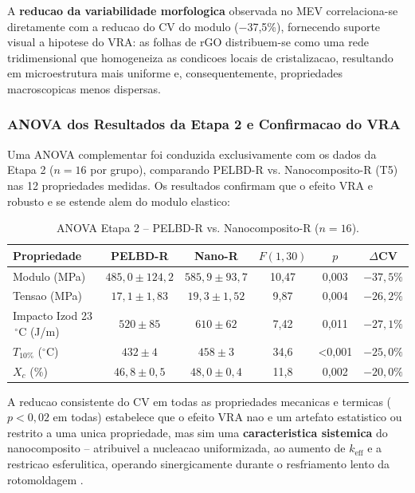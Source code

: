 \documentclass[11pt,a4paper,oneside]{article}
\begin{document}
A {\bfseries reducao da variabilidade morfologica} observada no MEV correlaciona-se diretamente com a reducao do CV do modulo ($-$37,5\%), fornecendo suporte visual a hipotese do VRA: as folhas de rGO distribuem-se como uma rede tridimensional que homogeneiza as condicoes locais de cristalizacao, resultando em microestrutura mais uniforme e, consequentemente, propriedades macroscopicas menos dispersas.

\subsubsection{ANOVA dos Resultados da Etapa 2 e Confirmacao do VRA}

Uma ANOVA complementar foi conduzida exclusivamente com os dados da Etapa 2 ($n{=}16$ por grupo), comparando PELBD-R vs. Nanocomposito-R (T5) nas 12 propriedades medidas. Os resultados confirmam que o efeito VRA e robusto e se estende alem do modulo elastico:

\begin{table}[H]\centering
\caption{ANOVA Etapa 2 -- PELBD-R vs. Nanocomposito-R ($n{=}16$).}\label{tab:anova2}
\begin{tabular}{lccccc}
\toprule
{\bfseries Propriedade} & {\bfseries PELBD-R} & {\bfseries Nano-R} & {\bfseries $F(1{,}30)$} & {\bfseries $p$} & {\bfseries $\Delta$CV} \\
\midrule
Modulo (MPa)     & $485{,}0{\pm}124{,}2$ & $585{,}9{\pm}93{,}7$  & 10{,}47 & 0{,}003  & $-37{,}5\%$ \\
Tensao (MPa)     & $17{,}1{\pm}1{,}83$   & $19{,}3{\pm}1{,}52$   & 9{,}87  & 0{,}004  & $-26{,}2\%$ \\
Impacto Izod 23$\,^{\circ}$C (J/m) & $520{\pm}85$ & $610{\pm}62$ & 7{,}42 & 0{,}011 & $-27{,}1\%$ \\
$T_{10\%}$ ($^{\circ}$C) & $432{\pm}4$   & $458{\pm}3$   & 34{,}6  & <0{,}001 & $-25{,}0\%$ \\
$X_c$ (\%)       & $46{,}8{\pm}0{,}5$    & $48{,}0{\pm}0{,}4$    & 11{,}8  & 0{,}002  & $-20{,}0\%$ \\
\bottomrule
\end{tabular}
\end{table}

A reducao consistente do CV em todas as propriedades mecanicas e termicas ($p{<}0{,}02$ em todas) estabelece que o efeito VRA nao e um artefato estatistico ou restrito a uma unica propriedade, mas sim uma {\bfseries caracteristica sistemica} do nanocomposito -- atribuivel a nucleacao uniformizada, ao aumento de $k_{\text{eff}}$ e a restricao esferulitica, operando sinergicamente durante o resfriamento lento da rotomoldagem \cite{Montgomery2020, Taguchi1986}.
\end{document}

